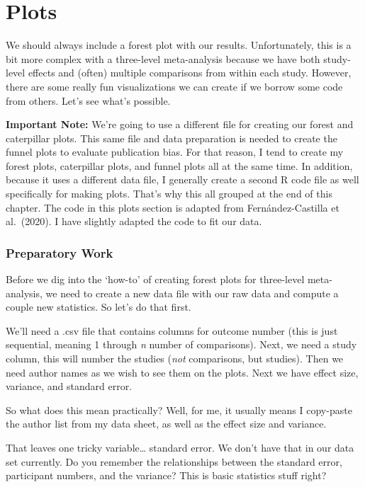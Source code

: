 \documentclass[
]{book}
\begin{document}
\hypertarget{plots}{%
\section{Plots}\label{plots}}

We should always include a forest plot with our results. Unfortunately, this is a bit more complex with a three-level meta-analysis because we have both study-level effects and (often) multiple comparisons from within each study. However, there are some really fun visualizations we can create if we borrow some code from others. Let's see what's possible.

\textbf{Important Note:} We're going to use a different file for creating our forest and caterpillar plots. This same file and data preparation is needed to create the funnel plots to evaluate publication bias. For that reason, I tend to create my forest plots, caterpillar plots, and funnel plots all at the same time. In addition, because it uses a different data file, I generally create a second R code file as well specifically for making plots. That's why this all grouped at the end of this chapter.
The code in this plots section is adapted from Fernández-Castilla et al.~(2020)\citep{fernández-castilla2020}. I have slightly adapted the code to fit our data.

\hypertarget{preparatory-work}{%
\subsubsection{Preparatory Work}\label{preparatory-work}}

Before we dig into the `how-to' of creating forest plots for three-level meta-analysis, we need to create a new data file with our raw data and compute a couple new statistics. So let's do that first.

We'll need a .csv file that contains columns for outcome number (this is just sequential, meaning 1 through \emph{n} number of comparisons). Next, we need a study column, this will number the studies (\emph{not} comparisons, but studies). Then we need author names as we wish to see them on the plots. Next we have effect size, variance, and standard error.

So what does this mean practically? Well, for me, it usually means I copy-paste the author list from my data sheet, as well as the effect size and variance.

That leaves one tricky variable\ldots{} standard error. We don't have that in our data set currently. Do you remember the relationships between the standard error, participant numbers, and the variance? This is basic statistics stuff right?
\end{document}
